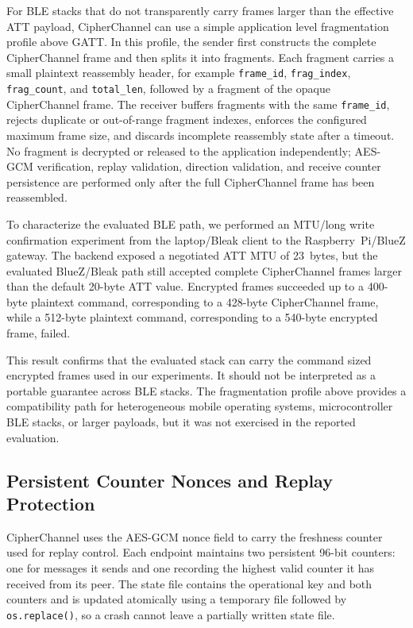 \documentclass[journal]{IEEEtran}
\begin{document}
For BLE stacks that do not transparently carry frames larger than the effective ATT payload, CipherChannel can use a simple application level fragmentation profile above GATT. In this profile, the sender first constructs the complete CipherChannel frame and then splits it into fragments. Each fragment carries a small plaintext reassembly header, for example \texttt{frame\_id}, \texttt{frag\_index}, \texttt{frag\_count}, and \texttt{total\_len}, followed by a fragment of the opaque CipherChannel frame. The receiver buffers fragments with the same \texttt{frame\_id}, rejects duplicate or out-of-range fragment indexes, enforces the configured maximum frame size, and discards incomplete reassembly state after a timeout. No fragment is decrypted or released to the application independently; AES-GCM verification, replay validation, direction validation, and receive counter persistence are performed only after the full CipherChannel frame has been reassembled.

To characterize the evaluated BLE path, we performed an MTU/long write confirmation experiment from the laptop/Bleak client to the Raspberry~Pi/BlueZ gateway. The backend exposed a negotiated ATT MTU of 23~bytes, but the evaluated BlueZ/Bleak path still accepted complete CipherChannel frames larger than the default 20-byte ATT value. Encrypted frames succeeded up to a 400-byte plaintext command, corresponding to a 428-byte CipherChannel frame, while a 512-byte plaintext command, corresponding to a 540-byte encrypted frame, failed.

This result confirms that the evaluated stack can carry the command sized encrypted frames used in our experiments. It should not be interpreted as a portable guarantee across BLE stacks. The fragmentation profile above provides a compatibility path for heterogeneous mobile operating systems, microcontroller BLE stacks, or larger payloads, but it was not exercised in the reported evaluation.


\subsection{Persistent Counter Nonces and Replay Protection}
\label{sec:counternonce}

CipherChannel uses the AES-GCM nonce field to carry the freshness counter used for replay control. Each endpoint maintains two persistent 96-bit counters: one for messages it sends and one recording the highest valid counter it has received from its peer. The state file contains the operational key and both counters and is updated atomically using a temporary file followed by \texttt{os.replace()}, so a crash cannot leave a partially written state file.
\end{document}
